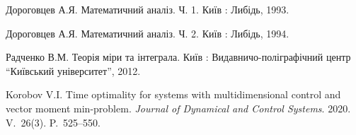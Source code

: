 \begin{thebibliography}{XX}

Дороговцев А.Я. Математичний аналіз. Ч. 1. Київ : Либідь, 1993.
	
Дороговцев А.Я. Математичний аналіз. Ч. 2. Київ : Либідь, 1994.

Радченко В.М. Теорія міри та інтеграла. Київ : Видавничо-полі\-гра\-фіч\-ний  центр ``Київський університет'', 2012.

Korobov V.I. Time optimality for systems with multidimensional control and vector moment min-problem. \emph{Journal of Dynamical and Control Systems}. 2020. V.~26(3). P.~525--550.

\end{thebibliography}
